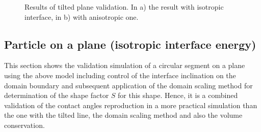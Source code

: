 	\begin{figure}
		\centering
		\caption[Results of tilted plane validation]{Results of tilted plane validation. In a) the result with isotropic interface, in b) with anisotropic one. }
		\label{fig_tilted_plane_validation_results}
	\end{figure}
	
	\subsection{Particle on a plane (isotropic interface energy)}
	This section shows the validation simulation of a circular segment on a plane using the above model including control of the interface inclination on the domain boundary and subsequent application of the domain scaling method for determination of the shape factor $S$ for this shape. Hence, it is a combined validation of the contact angles reproduction in a more practical simulation than the one with the tilted line, the domain scaling method and also the volume conservation.
	
